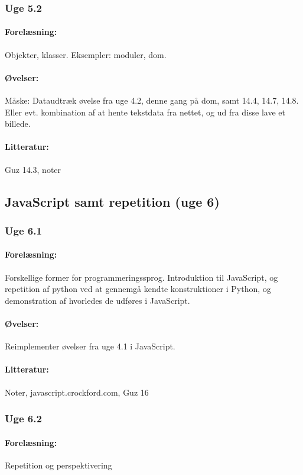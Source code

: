\documentclass[12pt]{article}
\begin{document}
\subsubsection{Uge 5.2}
\paragraph{Forelæsning:} 
Objekter, klasser.
Eksempler: moduler, dom.
\paragraph{Øvelser:}
Måske: Dataudtræk øvelse fra uge 4.2, denne gang på dom, samt  14.4, 14.7, 14.8. Eller evt. kombination af at hente tekstdata fra nettet, og ud fra disse lave et billede.
\paragraph{Litteratur:} Guz 14.3, noter

\subsection{JavaScript samt repetition (uge 6)}
\subsubsection{Uge 6.1}
\paragraph{Forelæsning:} 
Forskellige former for programmeringssprog.
Introduktion til JavaScript, og repetition af python ved at gennemgå kendte konstruktioner i Python, og demonstration af hvorledes de udføres i JavaScript.
\paragraph{Øvelser:}
Reimplementer øvelser fra uge 4.1 i JavaScript.
\paragraph{Litteratur:} Noter, javascript.crockford.com, Guz 16

\subsubsection{Uge 6.2}
\paragraph{Forelæsning:} 
Repetition og perspektivering
\end{document}

